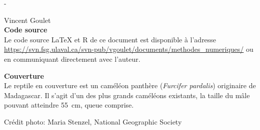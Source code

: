 \begingroup
\calccentering{\unitlength}
\begin{adjustwidth*}{\unitlength}{-\unitlength}
  \setlength{\parindent}{0pt}
  \setlength{\parskip}{\baselineskip}

  {\textcopyright} {\year} Vincent Goulet \\

  

  \textbf{Code source} \\
  Le code source {\LaTeX} et R de ce document est disponible à l'adresse
    \url{https://svn.fsg.ulaval.ca/svn-pub/vgoulet/documents/methodes_numeriques/}
  ou en communiquant directement avec l'auteur.

  \textbf{Couverture} \\
  Le reptile en couverture est un caméléon panthère (\emph{Furcifer
    pardalis}) originaire de Madagascar. Il s'agit d'un des plus
  grands caméléons existants, la taille du mâle pouvant atteindre
  55~cm, queue comprise.

  Crédit photo: Maria Stenzel, National Geographic Society
\end{adjustwidth*}
\endgroup

